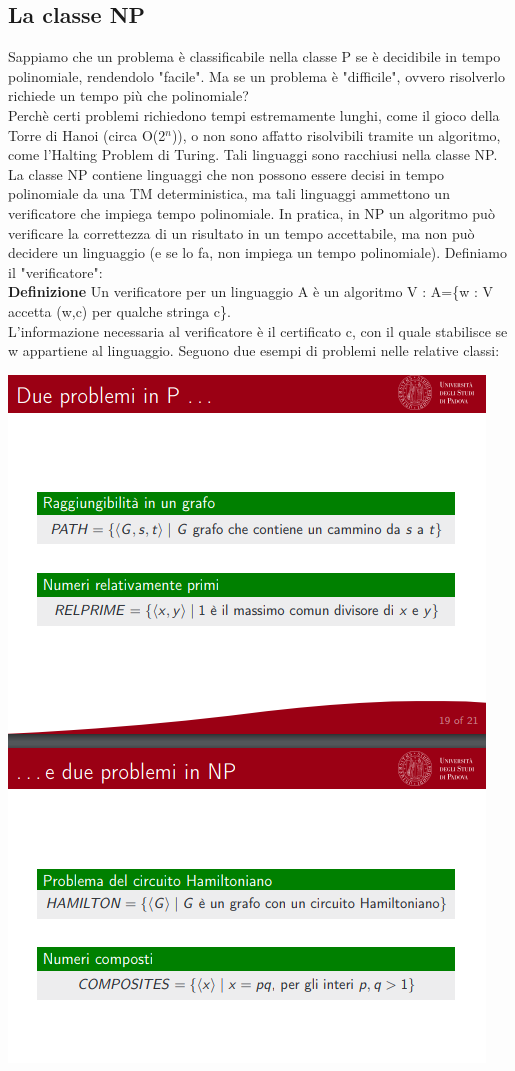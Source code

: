 \documentclass[]{article}
\begin{document}
		\subsection{La classe NP}
			Sappiamo che un problema è classificabile nella classe P se è decidibile in tempo polinomiale, rendendolo "facile". Ma se un problema è "difficile", ovvero risolverlo richiede un tempo più che polinomiale?\\
			Perchè certi problemi richiedono tempi estremamente lunghi, come il gioco della Torre di Hanoi (circa O(2$^n$)), o non sono affatto risolvibili tramite un algoritmo, come l'Halting Problem di Turing. Tali linguaggi sono racchiusi nella classe NP.\\
			La classe NP contiene linguaggi che non possono essere decisi in tempo polinomiale da una TM deterministica, ma tali linguaggi ammettono un verificatore che impiega tempo polinomiale. In pratica, in NP un algoritmo può verificare la correttezza di un risultato in un tempo accettabile, ma non può decidere un linguaggio (e se lo fa, non impiega un tempo polinomiale). Definiamo il "verificatore":\\
			\textbf{Definizione} Un verificatore per un linguaggio A è un algoritmo V : A=\{w : V accetta (w,c) per qualche stringa c\}.\\
			L'informazione necessaria al verificatore è il certificato c, con il quale stabilisce se w appartiene al linguaggio. Seguono due esempi di problemi nelle relative classi:
			\begin{center}
				\includegraphics[scale=0.8]{PNP.png}
			\end{center}
\end{document}
